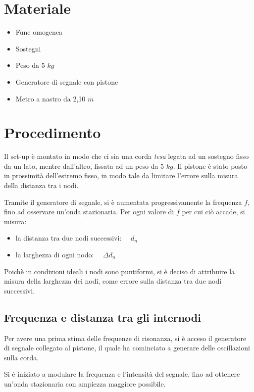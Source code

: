 \documentclass[12pt, a4paper]{article}
\begin{document}
\newpage

\section{Materiale}
\begin{itemize}
\setlength\itemsep{0mm}
    \item Fune omogenea
    \item Sostegni
    \item Peso da 5 $kg$
    \item Generatore di segnale con pistone
    \item Metro a nastro da 2,10 $m$
\end{itemize}



\addvspace{2cm}
\section{Procedimento}
Il set-up è montato in modo che ci sia una corda \textit{tesa} legata ad un sostegno fisso da un lato, mentre dall'altro, fissata ad un peso da $5$ $kg$. Il pistone è stato posto in prossimità dell'estremo fisso, in modo tale da limitare l'errore sulla misura della distanza tra i  nodi.


Tramite il generatore di segnale, si è aumentata progressivamente la frequenza $f$, fino ad osservare un'onda stazionaria. Per ogni valore di $f$ per cui ciò accade, si misura: 
\begin{itemize}
    \item la distanza tra due nodi successivi: $\quad d_n$
    \item la larghezza di ogni nodo: $\quad\Delta d_n$
\end{itemize}

Poichè in condizioni ideali i nodi sono puntiformi, si è deciso di attribuire la misura della larghezza dei nodi, come errore sulla distanza tra due nodi successivi.




  \addvspace{2cm}
\subsection{Frequenza e distanza tra gli internodi}
Per avere una prima stima delle frequenze di risonanza, si è acceso il generatore di segnale collegato al pistone, il quale ha cominciato a generare delle oscillazioni sulla corda. 
\bigskip

Si è iniziato a modulare la frequenza e l'intensità del segnale, fino ad ottenere un'onda stazionaria con ampiezza maggiore possibile.
\bigskip
\end{document}
